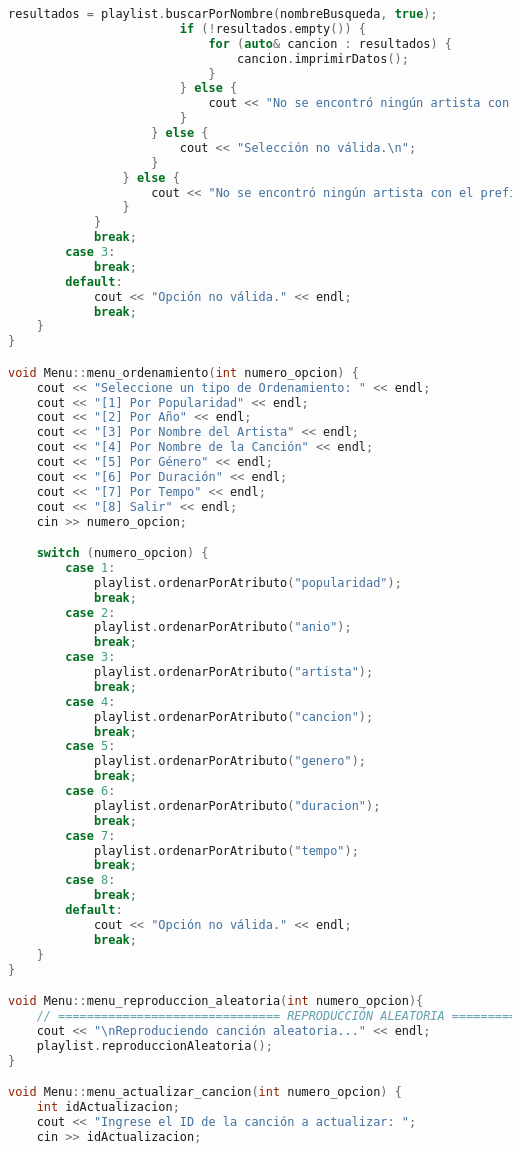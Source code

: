 \documentclass[corference]{IEEEtran}
\begin{document}
\begin{flushleft}
\begin{sloppypar}
\begin{lstlisting}[language=C++, style=mystyle, caption={Cabecera de la Clase Menú}]
                        resultados = playlist.buscarPorNombre(nombreBusqueda, true);
                        if (!resultados.empty()) {
                            for (auto& cancion : resultados) {
                                cancion.imprimirDatos();
                            }
                        } else {
                            cout << "No se encontró ningún artista con el nombre " << nombreBusqueda << ".\n";
                        }
                    } else {
                        cout << "Selección no válida.\n";
                    }
                } else {
                    cout << "No se encontró ningún artista con el prefijo " << nombreBusqueda << ".\n";
                }
            }
            break;
        case 3:
            break;
        default:
            cout << "Opción no válida." << endl;
            break;
    }
}

void Menu::menu_ordenamiento(int numero_opcion) {
    cout << "Seleccione un tipo de Ordenamiento: " << endl;
    cout << "[1] Por Popularidad" << endl;
    cout << "[2] Por Año" << endl;
    cout << "[3] Por Nombre del Artista" << endl;
    cout << "[4] Por Nombre de la Canción" << endl;
    cout << "[5] Por Género" << endl;
    cout << "[6] Por Duración" << endl;
    cout << "[7] Por Tempo" << endl;
    cout << "[8] Salir" << endl;
    cin >> numero_opcion;

    switch (numero_opcion) {
        case 1:
            playlist.ordenarPorAtributo("popularidad");
            break;
        case 2:
            playlist.ordenarPorAtributo("anio");
            break;
        case 3:
            playlist.ordenarPorAtributo("artista");
            break;
        case 4:
            playlist.ordenarPorAtributo("cancion");
            break;
        case 5:
            playlist.ordenarPorAtributo("genero");
            break;
        case 6:
            playlist.ordenarPorAtributo("duracion");
            break;
        case 7:
            playlist.ordenarPorAtributo("tempo");
            break;
        case 8:
            break;
        default:
            cout << "Opción no válida." << endl;
            break;
    }
}

void Menu::menu_reproduccion_aleatoria(int numero_opcion){
    // =============================== REPRODUCCIÓN ALEATORIA ===============================
    cout << "\nReproduciendo canción aleatoria..." << endl;
    playlist.reproduccionAleatoria();
} 

void Menu::menu_actualizar_cancion(int numero_opcion) {
    int idActualizacion;
    cout << "Ingrese el ID de la canción a actualizar: ";
    cin >> idActualizacion;


\end{lstlisting}
\end{sloppypar}
\end{flushleft}
\end{document}
